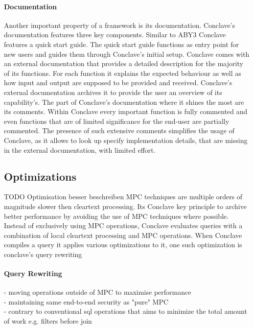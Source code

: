 \paragraph{Documentation}
Another important property of a framework is its documentation. Conclave's documentation features three key components. Similar to ABY3 Conclave features a quick start guide. The quick start guide functions as entry point for new users and guides them through Conclave's initial setup. 
Conclave comes with an external documentation that provides a detailed description for the majority of its functions. For each function it explains the expected behaviour as well as how input and output are supposed to be provided and received. Conclave's external documentation archives it to provide the user an overview of its capability's. 
The part of Conclave's documentation where it shines the most are its comments. Within Conclave every important function is fully commented and even functions that are of limited significance for the end-user are partially commented. The presence of such extensive comments simplifies the usage of Conclave, as it allows to look up specify implementation details, that are missing in the external documentation, with limited effort.            


\subsection{Optimizations} TODO Optimisation besser beschreiben 
MPC techniques are multiple orders of magnitude slower then cleartext processing. Its Conclave key principle to archive better performance by avoiding the use of MPC techniques where possible. Instead of exclusively using MPC operations, Conclave evaluates queries with a combination of local cleartext processing and MPC operations. When Conclave compiles a query it applies various optimizations to it, one such optimization is conclave's query rewriting 
\paragraph{Query Rewriting}
- moving operations outside of MPC to maximise performance\\
- maintaining same end-to-end security as "pure" MPC     \\
- contrary to conventional sql operations that aims to minimize the total amount of work e.g. filters before join \\


